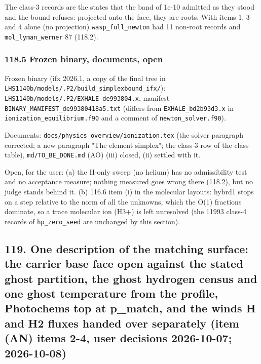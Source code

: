\documentclass[english,a4paper]{my_memo}
\begin{document}
The class-3 records are the states that the band of 1e-10 admitted as they
stood and the bound refuses: projected onto the face, they are roots. With
items 1, 3 and 4 alone (no projection) \texttt{wasp\_full\_newton} had 11 non-root
records and \texttt{mol\_lyman\_werner} 87 (118.2).

\subsubsection{118.5 Frozen binary, documents, open}\label{1185-frozen-binary-documents-open}

Frozen binary (ifx 2026.1, a copy of the final tree in
\texttt{LHS1140b/models/.P2/build\_simplexbound\_ifx/}):
\texttt{LHS1140b/models/.P2/EXHALE\_de993804.x}, manifest
\texttt{BINARY\_MANIFEST\_de99380418a5.txt} (differs from \texttt{EXHALE\_bd2b93d3.x} in
\texttt{ionization\_equilibrium.f90} and a comment of \texttt{newton\_solver.f90}).

Documents: \texttt{docs/physics\_overview/ionization.tex} (the solver paragraph
corrected; a new paragraph "The element simplex"; the class-3 row of the
class table), \texttt{md/TO\_BE\_DONE.md} (AO) (iii) closed, (ii) settled with it.

Open, for the user: (a) the H-only sweep (no helium) has no admissibility test
and no acceptance measure; nothing measured goes wrong there (118.2), but no
judge stands behind it. (b) 116.6 item (i) in the molecular layouts: hybrd1
stops on a step relative to the norm of all the unknowns, which the O(1)
fractions dominate, so a trace molecular ion (H3+) is left unresolved (the
11993 class-4 records of \texttt{hp\_zero\_seed} are unchanged by this section).

\subsection{119. One description of the matching surface: the carrier base face open against the stated ghost partition, the ghost hydrogen census and one ghost temperature from the profile, Photochem\textquotesingle s top at p\_match, and the wind\textquotesingle s H and H2 fluxes handed over separately (item (AN) items 2-4, user decisions 2026-10-07; 2026-10-08)}\label{119-one-description-of-the-matching-surface-the-carrier-base-face-open-against-the-stated-ghost-partition-the-ghost-hydrogen-census-and-one-ghost-temperature-from-the-profile-photochems-top-at-p_match-and-the-winds-h-and-h2-fluxes-handed-over-separately-item-an-items-2-4-user-decisions-2026-10-07-2026-10-08}
\end{document}
